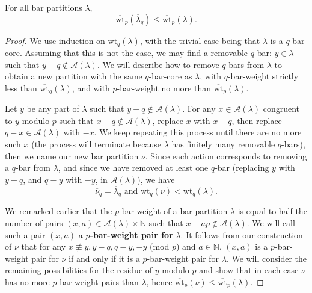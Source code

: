 \documentclass[ALCO, Unicode,published]{cedram}
\begin{document}
\begin{prop}\label{prop1}
For all bar partitions $\lambda$, 
$$\overline{\text{wt}}_p(\overline{\lambda}_q)\leq\overline{\text{wt}}_p(\lambda).$$
\end{prop}
\begin{proof}
We use induction on $\overline{\text{wt}}_q(\lambda)$, with the trivial case being that $\lambda$ is a $q$-bar-core. Assuming that this is not the case, we may find a removable $q$-bar: $y\in\lambda$ such that $y-q\not\in\mathcal{A}(\lambda)$. We will describe how to remove $q$-bars from $\lambda$ to obtain a new partition with the same $q$-bar-core as $\lambda$, with $q$-bar-weight strictly less than $\overline{\text{wt}}_q(\lambda)$, and with $p$-bar-weight no more than $\overline{\text{wt}}_p(\lambda)$.

Let $y$ be any part of $\lambda$ such that $y-q\not\in\mathcal{A}(\lambda)$. For any $x\in\mathcal{A}(\lambda)$ congruent to $y$ modulo $p$ such that $x-q\not\in\mathcal{A}(\lambda)$, replace $x$ with $x-q$, then replace $q-x\in\mathcal{A}(\lambda)$ with $-x$. We keep repeating this process until there are no more such $x$ (the process will terminate because $\lambda$ has finitely many removable $q$-bars), then we name our new bar partition $\nu$. Since each action corresponds to removing a $q$-bar from $\lambda$, and since we have removed at least one $q$-bar (replacing $y$ with $y-q$, and $q-y$ with $-y$, in $\mathcal{A}(\lambda)$), we have 
$$\overline{\nu}_q=\overline{\lambda}_q\text{ and }\overline{\text{wt}}_q(\nu)<\overline{\text{wt}}_q(\lambda).$$ 

We remarked earlier that the $p$-bar-weight of a bar partition $\lambda$ is equal to half the number of pairs $(x,a)\in\mathcal{A}(\lambda)\times\mathbb{N}$ such that $x-ap\not\in\mathcal{A}(\lambda)$. We will call such a pair $(x,a)$ a $p$\textbf{-bar-weight pair for} $\lambda$. It follows from our construction of $\nu$ that for any $x\not\equiv y,y-q,q-y,-y$ (mod $p$) and $a\in\mathbb{N}$, $(x,a)$ is a $p$-bar-weight pair for $\nu$ if and only if it is a $p$-bar-weight pair for $\lambda$. We will consider the remaining possibilities for the residue of $y$ modulo $p$ and show that in each case $\nu$ has no more $p$-bar-weight pairs than $\lambda$, hence $\overline{\text{wt}}_p(\nu)\leq\overline{\text{wt}}_p(\lambda)$. 


\end{proof}
\end{document}
